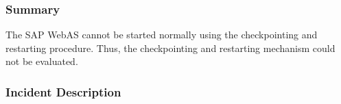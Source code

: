 







\subsubsection{Summary}
The SAP WebAS cannot be started normally using the checkpointing and restarting procedure. Thus, the checkpointing and restarting mechanism could not be evaluated. 

\subsubsection{Incident Description}

